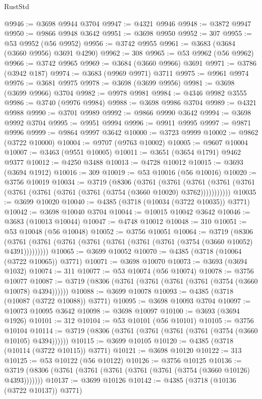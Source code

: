 \begin{lexlean}{RustStd}
\begin{coremodule}
@9946 := @3698 @9944 @3704
@9947 := @4321 @9946
@9948 := @3872 @9947
@9950 := @9866 @9948 @3642
@9951 := @3698 @9950
@9952 := 307
@9955 := @53 @9952 (@56 @9952)
@9956 := @3742 @9955
@9961 := @3683 (@3684 (@3660 @9956) @3691 @4290)
@9962 := 308
@9965 := @53 @9962 (@56 @9962)
@9966 := @3742 @9965
@9969 := @3684 (@3660 @9966) @3691
@9971 := @3786 (@3942 @187)
@9974 := @3683 (@9969 @9971) @3711
@9975 := @9961 @9974
@9976 := @3681 @9975
@9978 := @3698 (@3699 @9956)
@9981 := @3698 (@3699 @9966) @3704
@9982 := @9978 @9981
@9984 := @4346 @9982 @3555
@9986 := @3740 (@9976 @9984)
@9988 := @3698 @9986 @3704
@9989 := @4321 @9988
@9990 := @3701 @9989
@9992 := @9866 @9990 @3642
@9994 := @3698 @9992 @3704
@9995 := @9951 @9994
@9996 := @9911 @9995
@9997 := @9871 @9996
@9999 := @9864 @9997 @3642
@10000 := @3723 @9999
@10002 := @9862 (@3722 @10000)
@10004 := @9707 (@9763 @10002)
@10005 := @9607 @10004
@10007 := @3463 (@9551 @10005)
@10011 := @3651 (@3654 @1791) @9462 @9377
@10012 := @4250 @3488
@10013 := @4728 @10012
@10015 := @3693 (@3694 @1912)
@10016 := 309
@10019 := @53 @10016 (@56 @10016)
@10020 := @3756 @10019
@10034 := @3719
    (@8306
      (@3761
        (@3761
          (@3761 (@3761 (@3761 (@3761 (@3761 (@3761 (@3761 (@3754 (@3660 @10020) @3762)))))))))))
@10035 := @3699 @10020
@10040 := @4385 (@3718 (@10034 (@3722 @10035)) @3771)
@10042 := @3698 @10040 @3704
@10044 := @10015 @10042 @3642
@10046 := @3683 (@10013 @10044)
@10047 := @4748 @10012
@10048 := 310
@10051 := @53 @10048 (@56 @10048)
@10052 := @3756 @10051
@10064 := @3719
    (@8306 (@3761 (@3761 (@3761 (@3761 (@3761 (@3761 (@3761 (@3754 (@3660 @10052) @4391)))))))))
@10065 := @3699 @10052
@10070 := @4385 (@3718 (@10064 (@3722 @10065)) @3771)
@10071 := @3698 @10070
@10073 := @3693 (@3694 @1032)
@10074 := 311
@10077 := @53 @10074 (@56 @10074)
@10078 := @3756 @10077
@10087 := @3719 (@8306 (@3761 (@3761 (@3761 (@3761 (@3754 (@3660 @10078) @4394))))))
@10088 := @3699 @10078
@10093 := @4385 (@3718 (@10087 (@3722 @10088)) @3771)
@10095 := @3698 @10093 @3704
@10097 := @10073 @10095 @3642
@10098 := @3698 @10097
@10100 := @3693 (@3694 @1926)
@10101 := 312
@10104 := @53 @10101 (@56 @10101)
@10105 := @3756 @10104
@10114 := @3719 (@8306 (@3761 (@3761 (@3761 (@3761 (@3754 (@3660 @10105) @4394))))))
@10115 := @3699 @10105
@10120 := @4385 (@3718 (@10114 (@3722 @10115)) @3771)
@10121 := @3698 @10120
@10122 := 313
@10125 := @53 @10122 (@56 @10122)
@10126 := @3756 @10125
@10136 := @3719 (@8306 (@3761 (@3761 (@3761 (@3761 (@3761 (@3754 (@3660 @10126) @4393)))))))
@10137 := @3699 @10126
@10142 := @4385 (@3718 (@10136 (@3722 @10137)) @3771)

\end{coremodule}
\end{lexlean}
